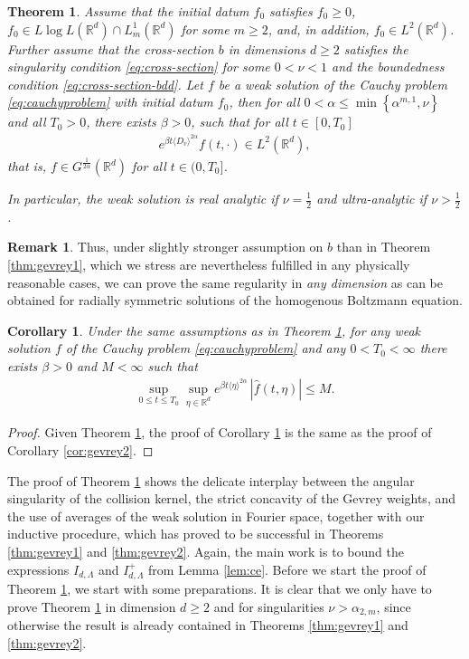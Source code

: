 \documentclass[11pt,a4paper,reqno]{amsart}
\theoremstyle{plain}
\newtheorem{corollary}[proposition]{Corollary}
\newtheorem{theorem}[proposition]{Theorem}
\theoremstyle{definition}
\newtheorem{remark}[proposition]{Remark}
\begin{document}
\begin{theorem}\label{thm:gevrey3}
	Assume that the initial datum $f_0$ satisfies $f_0\geq 0$, $f_0 \in L\log L({\mathbb{R}}^d) \cap L^1_{m}({\mathbb{R}}^d)$ for some $m\geq 2$, and, in addition, $f_0\in L^2({\mathbb{R}}^d)$.
	Further assume that the cross-section $b$ in dimensions $d\geq 2$ satisfies the \emph{singularity condition} \eqref{eq:cross-section} for some $0<\nu<1$ and the \emph{boundedness condition} \eqref{eq:cross-section-bdd}. Let $f$ be a weak solution of the Cauchy problem \eqref{eq:cauchyproblem} with initial datum $f_0$, then for all $0<\alpha\leq \min\left\{\alpha^{m,1}, \nu\right\}$ and all $T_0>0$, there exists $\beta>0$, such that for all $t\in[0, T_0]$ 	
 	\begin{align}\label{eq:local-time-uniform-3}
		e^{\beta t \langle D_v\rangle^{2\alpha}} f(t,\cdot) \in L^2({\mathbb{R}}^d),
	\end{align}
	that is, $f\in G^{\tfrac{1}{2\alpha}}({\mathbb{R}}^d)$ for all $t\in(0,T_0]$.

	In particular, the weak solution is real analytic if $\nu=\frac{1}{2}$ and ultra-analytic if $\nu>\frac{1}{2}$.
\end{theorem}

\begin{remark} Thus, under slightly stronger assumption on $b$ than in Theorem \ref{thm:gevrey1}, which we stress are nevertheless fulfilled in any physically reasonable cases, we can prove the same regularity in \emph{any dimension} as can be obtained for radially symmetric  solutions of the homogenous Boltzmann equation.
\end{remark}
\begin{corollary}\label{cor:gevrey3}
	Under the same assumptions as in Theorem \ref{thm:gevrey3}, for any weak solution
	$f$ of the Cauchy problem \eqref{eq:cauchyproblem} and any $0<T_0<\infty$ there exists $\beta>0$ and $M<\infty$ such that
	\begin{align}\label{eq:cor-gevrey3}
		\sup_{0\le t\le T_0}\sup_{\eta\in{\mathbb{R}}^d} e^{ \beta t \langle \eta \rangle^{2\alpha}} \, |\hat{f}(t,\eta)| \le M .
	\end{align}
\end{corollary}
\begin{proof}
	Given Theorem \ref{thm:gevrey3}, the proof of Corollary \ref{cor:gevrey3} is the same as the proof of Corollary \ref{cor:gevrey2}.
\end{proof}

The proof of Theorem \ref{thm:gevrey3} shows the delicate interplay between the angular singularity of the collision kernel, the strict concavity of the Gevrey weights, and the use of averages of the weak solution in Fourier space, together with our inductive procedure, which has proved to be successful in Theorems \ref{thm:gevrey1} and \ref{thm:gevrey2}.
Again, the main work is to bound the expressions $I_{d,\Lambda}$ and $I_{d,\Lambda}^+$ from Lemma \ref{lem:ce}.
Before we start the proof of Theorem \ref{thm:gevrey3}, we start with some preparations. It is clear that we only have to prove Theorem \ref{thm:gevrey3} in dimension $d\ge 2$ and for singularities $\nu >\alpha_{2,m}$, since otherwise the result is already contained in Theorems \ref{thm:gevrey1} and \ref{thm:gevrey2}.
\end{document}
